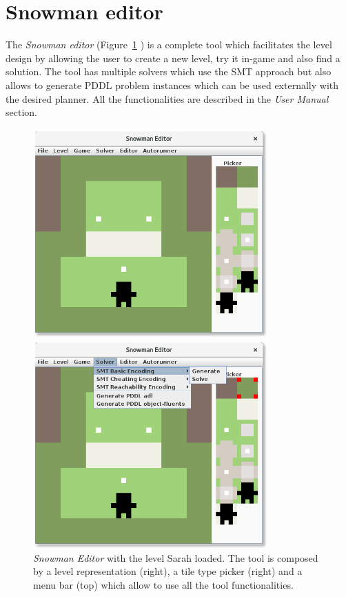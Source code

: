 \documentclass{report}
\theoremstyle{plain}
\begin{document}
\section{Snowman editor}
The \emph{Snowman editor} (Figure~\ref{fig:gui} ) is a complete tool which facilitates the level design by allowing the user to create a new level, try it in-game and also find a solution. The tool has multiple solvers which use the SMT approach but also allows to generate PDDL problem instances which can be used externally with the desired planner. All the functionalities are described in the \emph{User Manual} section.


\begin{figure}
    \begin{minipage}{0.5\textwidth}
    \centering
    \includegraphics[width=0.8\textwidth]{gui-1.png}
    \end{minipage}
    \begin{minipage}{0.5\textwidth}
    \centering
    \includegraphics[width=0.8\textwidth]{gui-2.png}
    \end{minipage}
    \caption{\emph{Snowman Editor} with the level Sarah loaded. The tool is composed by a level representation (right), a tile type picker (right) and a menu bar (top) which allow to use all the tool functionalities.}
    \label{fig:gui}
\end{figure}
\end{document}
